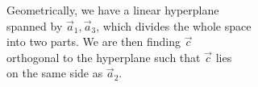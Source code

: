 \documentclass[preview]{standalone}
\begin{document}
\begin{center}
Geometrically, we have a linear hyperplane\\spanned by $\vec{a}_1,\vec{a}_3$, which divides the whole space\\into two parts. We are then finding $\vec{c}$\\orthogonal to the hyperplane such that $\vec{c}$ lies\\on the same side as $\vec{a}_2$.
\end{center}
\end{document}
